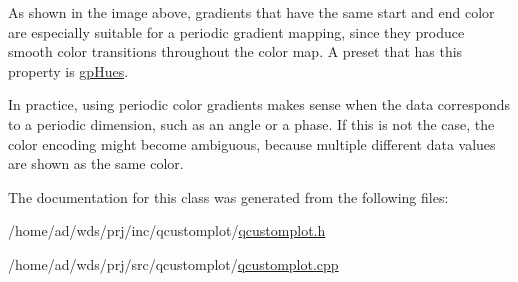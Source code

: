 As shown in the image above, gradients that have the same start and end color are especially suitable for a periodic gradient mapping, since they produce smooth color transitions throughout the color map. A preset that has this property is \hyperlink{class_q_c_p_color_gradient_aed6569828fee337023670272910c9072a30efe58407acfb67939032f70213a130}{gp\+Hues}.

In practice, using periodic color gradients makes sense when the data corresponds to a periodic dimension, such as an angle or a phase. If this is not the case, the color encoding might become ambiguous, because multiple different data values are shown as the same color. 

The documentation for this class was generated from the following files\+:\begin{DoxyCompactItemize}
\item 
/home/ad/wds/prj/inc/qcustomplot/\hyperlink{qcustomplot_8h}{qcustomplot.\+h}\item 
/home/ad/wds/prj/src/qcustomplot/\hyperlink{qcustomplot_8cpp}{qcustomplot.\+cpp}\end{DoxyCompactItemize}
